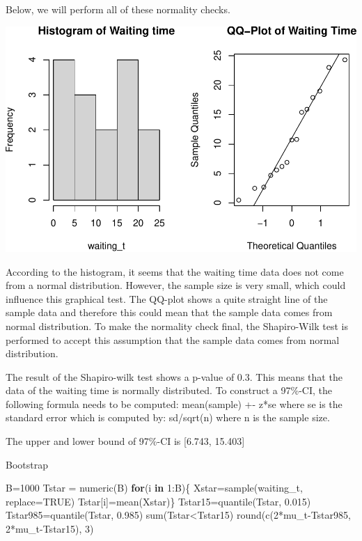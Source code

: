 \documentclass[
]{article}
\newenvironment{Shaded}{\begin{snugshade}}{\end{snugshade}}
\newcommand{\AttributeTok}[1]{\textcolor[rgb]{0.77,0.63,0.00}{#1}}
\newcommand{\ConstantTok}[1]{\textcolor[rgb]{0.00,0.00,0.00}{#1}}
\newcommand{\ControlFlowTok}[1]{\textcolor[rgb]{0.13,0.29,0.53}{\textbf{#1}}}
\newcommand{\DecValTok}[1]{\textcolor[rgb]{0.00,0.00,0.81}{#1}}
\newcommand{\FloatTok}[1]{\textcolor[rgb]{0.00,0.00,0.81}{#1}}
\newcommand{\FunctionTok}[1]{\textcolor[rgb]{0.00,0.00,0.00}{#1}}
\newcommand{\NormalTok}[1]{#1}
\newcommand{\OtherTok}[1]{\textcolor[rgb]{0.56,0.35,0.01}{#1}}
\newcommand{\SpecialCharTok}[1]{\textcolor[rgb]{0.00,0.00,0.00}{#1}}
\begin{document}
Below, we will perform all of these normality checks.

\includegraphics{assignment1_group75_final_files/figure-latex/unnamed-chunk-1-1.pdf}

According to the histogram, it seems that the waiting time data does not
come from a normal distribution. However, the sample size is very small,
which could influence this graphical test. The QQ-plot shows a quite
straight line of the sample data and therefore this could mean that the
sample data comes from normal distribution. To make the normality check
final, the Shapiro-Wilk test is performed to accept this assumption that
the sample data comes from normal distribution.

The result of the Shapiro-wilk test shows a p-value of 0.3. This means
that the data of the waiting time is normally distributed. To construct
a 97\%-CI, the following formula needs to be computed: mean(sample) +-
z*se where se is the standard error which is computed by: sd/sqrt(n)
where n is the sample size.

The upper and lower bound of 97\%-CI is {[}6.743, 15.403{]}

Bootstrap

\begin{Shaded}
\begin{Highlighting}[]
\NormalTok{B}\OtherTok{=}\DecValTok{1000}
\NormalTok{Tstar }\OtherTok{=} \FunctionTok{numeric}\NormalTok{(B)}
\ControlFlowTok{for}\NormalTok{(i }\ControlFlowTok{in} \DecValTok{1}\SpecialCharTok{:}\NormalTok{B)\{}
\NormalTok{  Xstar}\OtherTok{=}\FunctionTok{sample}\NormalTok{(waiting\_t, }\AttributeTok{replace=}\ConstantTok{TRUE}\NormalTok{)}
\NormalTok{  Tstar[i]}\OtherTok{=}\FunctionTok{mean}\NormalTok{(Xstar)\}}
\NormalTok{Tstar15}\OtherTok{=}\FunctionTok{quantile}\NormalTok{(Tstar, }\FloatTok{0.015}\NormalTok{)}
\NormalTok{Tstar985}\OtherTok{=}\FunctionTok{quantile}\NormalTok{(Tstar, }\FloatTok{0.985}\NormalTok{)}
\FunctionTok{sum}\NormalTok{(Tstar}\SpecialCharTok{\textless{}}\NormalTok{Tstar15)}
\FunctionTok{round}\NormalTok{(}\FunctionTok{c}\NormalTok{(}\DecValTok{2}\SpecialCharTok{*}\NormalTok{mu\_t}\SpecialCharTok{{-}}\NormalTok{Tstar985, }\DecValTok{2}\SpecialCharTok{*}\NormalTok{mu\_t}\SpecialCharTok{{-}}\NormalTok{Tstar15), }\DecValTok{3}\NormalTok{)}
\end{Highlighting}
\end{Shaded}
\end{document}
